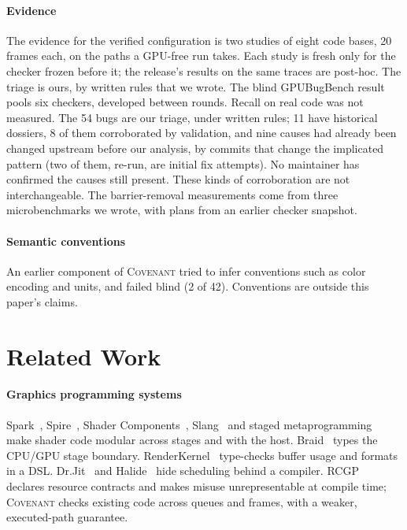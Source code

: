 \documentclass[acmtog,anonymous,review]{acmart}
\newcommand{\sys}{\textsc{Covenant}\xspace}
\newcommand{\rcgp}{RCGP\xspace}
\newcommand{\bench}{GPUBugBench\xspace}
\begin{document}
\paragraph{Evidence}
The evidence for the verified configuration is two studies of eight code bases, 20 frames each, on the paths a GPU-free
run takes. Each study is fresh only for the checker frozen before it; the release's results on the same traces are
post-hoc. The triage is ours, by written rules that we wrote. The blind \bench result pools six checkers, developed
between rounds. Recall on real code was not measured. The 54 bugs are our triage, under written rules; 11 have
historical dossiers, 8 of them corroborated by validation, and nine causes had already been changed upstream before our
analysis, by commits that change the implicated pattern (two of them, re-run, are initial fix attempts). No maintainer
has confirmed the causes still present. These kinds of corroboration are not interchangeable. The barrier-removal
measurements come from three microbenchmarks we wrote, with plans from an earlier checker snapshot.

\paragraph{Semantic conventions}
An earlier component of \sys tried to infer conventions such as color encoding and units, and failed blind (2 of 42).
Conventions are outside this paper's claims.

\section{Related Work}
\label{sec:related}

\paragraph{Graphics programming systems}
Spark~\cite{foley2011spark}, Spire~\cite{he2016spire}, Shader Components~\cite{he2017shadercomponents},
Slang~\cite{he2018slang} and staged metaprogramming~\cite{seitz2019staged} make shader code modular across stages and
with the host. Braid~\cite{sampson2017braid} types the CPU/GPU stage boundary.
RenderKernel~\cite{yang2024renderkernel} type-checks buffer usage and formats in a DSL.
Dr.Jit~\cite{jakob2022drjit} and Halide~\cite{raganKelley2013halide} hide scheduling behind a compiler.
\rcgp~\cite{sivaram2026rcgp} declares resource contracts and makes misuse unrepresentable at compile time; \sys
checks existing code across queues and frames, with a weaker, executed-path guarantee.
\end{document}
